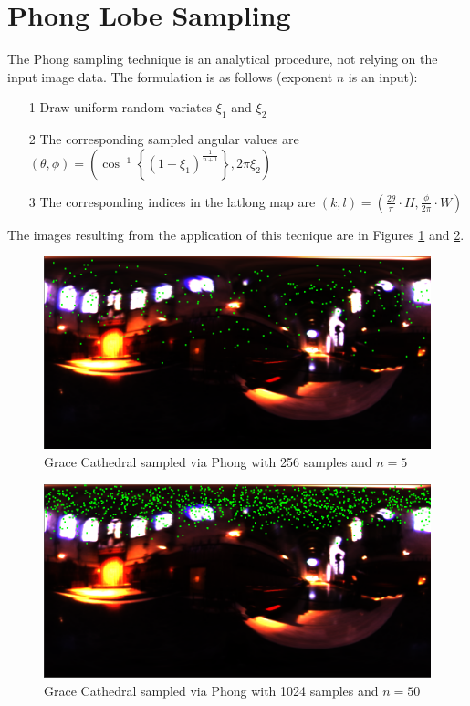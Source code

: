 \documentclass[a4paper,12pt,oneside,final]{report}
\newenvironment{changemargin}[2]{\begin{list}{}{%
\setlength{\topsep}{0pt}%
\setlength{\leftmargin}{0pt}%
\setlength{\rightmargin}{0pt}%
\setlength{\listparindent}{\parindent}%
\setlength{\itemindent}{\parindent}%
\setlength{\parsep}{0pt plus 1pt}%
\addtolength{\leftmargin}{#1}%
\addtolength{\rightmargin}{#2}%
}\item }{\end{list}}
\begin{document}
\section{Phong Lobe Sampling}
The Phong sampling technique is an analytical procedure, not relying on the input image data.  The formulation is as follows (exponent $n$ is an input):
\begin{itemize}
  \item[1] Draw uniform random variates $\xi_1$ and $\xi_2$
  \item[2] The corresponding sampled angular values are $(\theta, \phi) = \left(\cos^{-1}\left\{(1 - \xi_1)^{\frac{1}{n+1}}\right\}, 2\pi\xi_2\right)$
  \item[3] The corresponding indices in the latlong map are $(k, l) = \left(\frac{2\theta}{\pi} \cdot H, \frac{\phi}{2\pi} \cdot W\right)$
\end{itemize}
The images resulting from the application of this tecnique are in Figures \ref{fig:phong_256_10} and \ref{fig:phong_1024_50}.
\begin{figure}[!h]
  \begin{changemargin}{-50mm}{-50mm}
    \center
    \includegraphics[scale=0.4]{grace_phong_256_10.png}
    \caption{Grace Cathedral sampled via Phong with 256 samples and $n=5$ \label{fig:phong_256_10}}
  \end{changemargin}
\end{figure}

\begin{figure}[!h]
  \begin{changemargin}{-50mm}{-50mm}
    \center
    \includegraphics[scale=0.4]{grace_phong_1024_50.png}
    \caption{Grace Cathedral sampled via Phong with 1024 samples and $n=50$ \label{fig:phong_1024_50}}
  \end{changemargin}
\end{figure}
\end{document}

